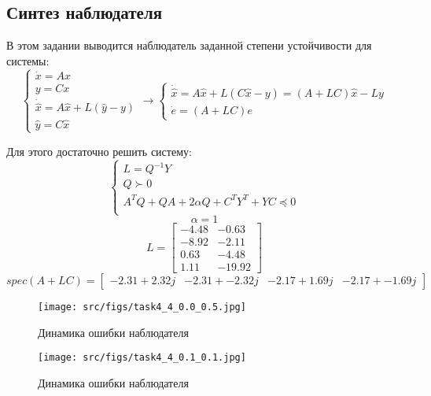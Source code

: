 \subsection{Синтез наблюдателя}

В этом задании выводится наблюдатель заданной степени устойчивости для системы:
\[
        \begin{cases}
                \dot{x} = A x \\
                y = C x \\
                \dot{\hat{x}} = A \hat{x} + L(\hat{y} - y) \\
                \hat{y} = C \hat{x}
        \end{cases} \rightarrow
        \begin{cases}
            \dot{\hat{x}} = A \hat{x} + L(C \hat{x} - y) = (A + LC )\hat{x} - Ly \\
            \dot{e} = (A + LC)e
            
    \end{cases}
\]

Для этого достаточно решить систему:
\[
        \begin{cases}
                L = Q^{-1}Y\\
                Q \succ 0 \\
                A^TQ + QA + 2 \alpha Q + C^T Y^T + YC \preccurlyeq 0  \\
        \end{cases} 
\]
\[ \alpha = 1\]
\[L = \begin{bmatrix}
 -4.48 & -0.63\\
 -8.92 & -2.11\\
  0.63 & -4.48\\
  1.11 & -19.92
\end{bmatrix}\]
\[spec(A + LC) = \begin{bmatrix}
 -2.31 + 2.32j & -2.31 + -2.32j & -2.17 + 1.69j & -2.17 + -1.69j
\end{bmatrix}\]
\begin{figure}[ht!]
    \centering
    \texttt{[image: src/figs/task4\_4\_0.0\_0.5.jpg]}
    \caption{Динамика ошибки наблюдателя}
    \label{fig:task4_4_1}
\end{figure}

\begin{figure}[ht!]
    \centering
    \texttt{[image: src/figs/task4\_4\_0.1\_0.1.jpg]}
    \caption{Динамика ошибки наблюдателя}
    \label{fig:task4_4_2}
\end{figure}

